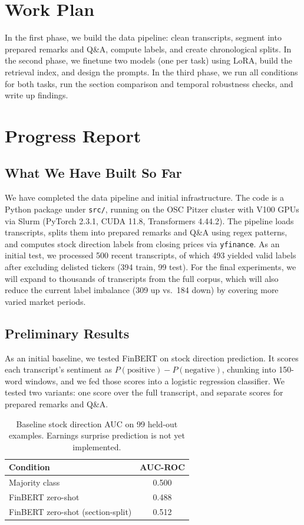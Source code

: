 \documentclass[11pt]{article}
\begin{document}
\section{Work Plan}

In the first phase, we build the data pipeline: clean transcripts, segment into prepared remarks and Q\&A, compute labels, and create chronological splits. In the second phase, we finetune two models (one per task) using LoRA, build the retrieval index, and design the prompts. In the third phase, we run all conditions for both tasks, run the section comparison and temporal robustness checks, and write up findings.

\section{Progress Report}

\subsection{What We Have Built So Far}

We have completed the data pipeline and initial infrastructure. The code is a Python package under \texttt{src/}, running on the OSC Pitzer cluster with V100 GPUs via Slurm (PyTorch 2.3.1, CUDA 11.8, Transformers 4.44.2). The pipeline loads transcripts, splits them into prepared remarks and Q\&A using regex patterns, and computes stock direction labels from closing prices via \texttt{yfinance}. As an initial test, we processed 500 recent transcripts, of which 493 yielded valid labels after excluding delisted tickers (394 train, 99 test). For the final experiments, we will expand to thousands of transcripts from the full corpus, which will also reduce the current label imbalance (309 up vs.\ 184 down) by covering more varied market periods.

\subsection{Preliminary Results}

As an initial baseline, we tested FinBERT \citep{Araci2019} on stock direction prediction. It scores each transcript's sentiment as $P(\text{positive}) - P(\text{negative})$, chunking into 150-word windows, and we fed those scores into a logistic regression classifier. We tested two variants: one score over the full transcript, and separate scores for prepared remarks and Q\&A.

\begin{table}[t]
\centering
\small
\begin{tabular}{@{}lc@{}}
\toprule
\textbf{Condition} & \textbf{AUC-ROC} \\
\midrule
Majority class & 0.500 \\
FinBERT zero-shot & 0.488 \\
FinBERT zero-shot (section-split) & 0.512 \\
\bottomrule
\end{tabular}
\caption{Baseline stock direction AUC on 99 held-out examples. Earnings surprise prediction is not yet implemented.}
\label{tab:preliminary}
\end{table}
\end{document}
